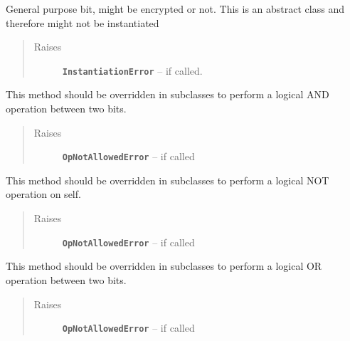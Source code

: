\documentclass[letterpaper,10pt,english]{sphinxmanual}
\begin{document}
\begin{fulllineitems}
\label{datatypes.bits:datatypes.bits.Bit.Bit}
General purpose bit, might be encrypted or not.
This is an abstract class and therefore might not be instantiated
\begin{quote}\begin{description}
\item[{Raises}] \leavevmode
\textbf{\texttt{InstantiationError}} -- if called.

\end{description}\end{quote}

\begin{fulllineitems}
\label{datatypes.bits:datatypes.bits.Bit.Bit.AND}
This method should be overridden in subclasses to perform a logical AND operation between two bits.
\begin{quote}\begin{description}
\item[{Raises}] \leavevmode
\textbf{\texttt{OpNotAllowedError}} -- if called

\end{description}\end{quote}

\end{fulllineitems}


\begin{fulllineitems}
\label{datatypes.bits:datatypes.bits.Bit.Bit.NOT}
This method should be overridden in subclasses to perform a logical NOT operation on self.
\begin{quote}\begin{description}
\item[{Raises}] \leavevmode
\textbf{\texttt{OpNotAllowedError}} -- if called

\end{description}\end{quote}

\end{fulllineitems}


\begin{fulllineitems}
\label{datatypes.bits:datatypes.bits.Bit.Bit.OR}
This method should be overridden in subclasses to perform a logical OR operation between two bits.
\begin{quote}\begin{description}
\item[{Raises}] \leavevmode
\textbf{\texttt{OpNotAllowedError}} -- if called


\end{description}
\end{quote}
\end{fulllineitems}
\end{fulllineitems}
\end{document}

